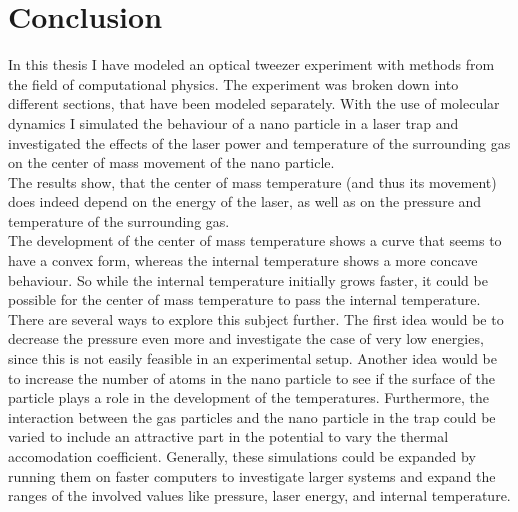 \documentclass[12pt]{article}
\begin{document}
\newpage
\section{Conclusion}
In this thesis I have modeled an optical tweezer experiment with methods from the field of computational physics. The experiment was broken down into
different sections, that have been modeled separately. With the use of molecular dynamics I simulated the behaviour of a nano particle in a laser trap
and investigated the effects of the laser power and temperature of the surrounding gas on the center of mass movement of the nano particle.\\
The results show, that the center of mass temperature (and thus its movement) does indeed depend on the energy of the laser, as well as on the
pressure and temperature of the surrounding gas.\\
The development of the center of mass temperature shows a curve that seems to have a convex form, whereas the internal temperature shows a more
concave behaviour. So while the internal temperature initially grows faster, it could be possible for the center of mass temperature to pass the
internal temperature.\\
There are several ways to explore this subject further. The first idea would be to decrease the pressure even more and investigate the case of very low
energies, since this is not easily feasible in an experimental setup. Another idea would be to increase the number of atoms in the nano particle to
see if the surface of the particle plays a role in the development of the temperatures. Furthermore, the interaction between the gas particles and the
nano particle in the trap could be varied to include an attractive part in the potential
to vary the thermal accomodation coefficient. Generally, these simulations could be expanded by running
them on faster computers to investigate larger systems and expand the ranges of the involved values like pressure, laser
energy, and internal temperature.




\newpage


\end{document}
